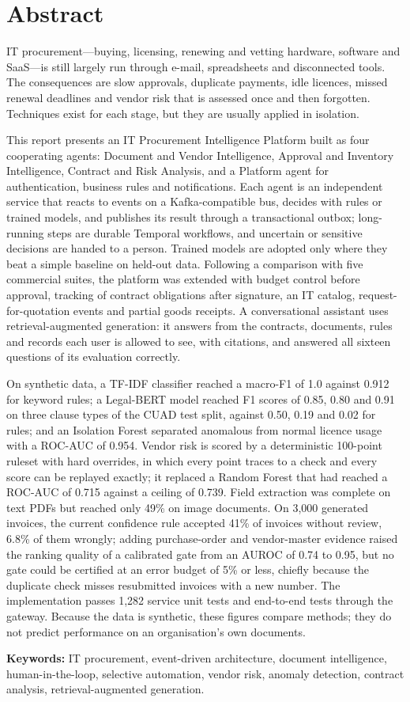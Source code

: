 \vspace{1in}
\chapter*{Abstract}

IT procurement---buying, licensing, renewing and vetting hardware, software and SaaS---is still largely run through e-mail, spreadsheets and disconnected tools. The consequences are slow approvals, duplicate payments, idle licences, missed renewal deadlines and vendor risk that is assessed once and then forgotten. Techniques exist for each stage, but they are usually applied in isolation.

This report presents an IT Procurement Intelligence Platform built as four cooperating agents: Document and Vendor Intelligence, Approval and Inventory Intelligence, Contract and Risk Analysis, and a Platform agent for authentication, business rules and notifications. Each agent is an independent service that reacts to events on a Kafka-compatible bus, decides with rules or trained models, and publishes its result through a transactional outbox; long-running steps are durable Temporal workflows, and uncertain or sensitive decisions are handed to a person. Trained models are adopted only where they beat a simple baseline on held-out data. Following a comparison with five commercial suites, the platform was extended with budget control before approval, tracking of contract obligations after signature, an IT catalog, request-for-quotation events and partial goods receipts. A conversational assistant uses retrieval-augmented generation: it answers from the contracts, documents, rules and records each user is allowed to see, with citations, and answered all sixteen questions of its evaluation correctly.

On synthetic data, a TF-IDF classifier reached a macro-F1 of 1.0 against 0.912 for keyword rules; a Legal-BERT model reached F1 scores of 0.85, 0.80 and 0.91 on three clause types of the CUAD test split, against 0.50, 0.19 and 0.02 for rules; and an Isolation Forest separated anomalous from normal licence usage with a ROC-AUC of 0.954. Vendor risk is scored by a deterministic 100-point ruleset with hard overrides, in which every point traces to a check and every score can be replayed exactly; it replaced a Random Forest that had reached a ROC-AUC of 0.715 against a ceiling of 0.739. Field extraction was complete on text PDFs but reached only 49\% on image documents. On 3,000 generated invoices, the current confidence rule accepted 41\% of invoices without review, 6.8\% of them wrongly; adding purchase-order and vendor-master evidence raised the ranking quality of a calibrated gate from an AUROC of 0.74 to 0.95, but no gate could be certified at an error budget of 5\% or less, chiefly because the duplicate check misses resubmitted invoices with a new number. The implementation passes 1,282 service unit tests and end-to-end tests through the gateway. Because the data is synthetic, these figures compare methods; they do not predict performance on an organisation's own documents.

\vspace{0.5cm}
\noindent\textbf{Keywords:} IT procurement, event-driven architecture, document intelligence, human-in-the-loop, selective automation, vendor risk, anomaly detection, contract analysis, retrieval-augmented generation.
